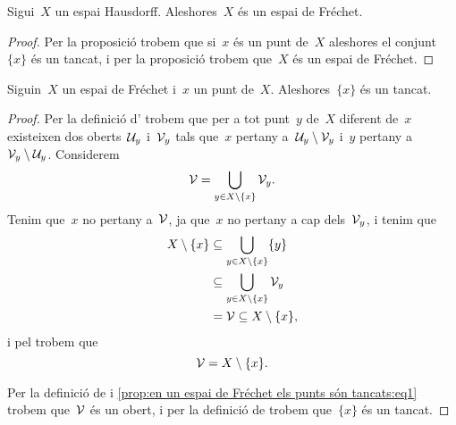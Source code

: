 \documentclass[../../main.tex]{subfiles}
\begin{document}
    \begin{corollary}
        \label{cor:els espais Hausdorff són Fréchet}
        Sigui~\(X\) un espai Hausdorff.
        Aleshores~\(X\) és un espai de Fréchet.
        \begin{proof}
            Per la proposició  trobem que si~\(x\) és un punt de~\(X\) aleshores el conjunt~\(\{x\}\) és un tancat, i per la proposició  trobem que~\(X\) és un espai de Fréchet.
        \end{proof}
    \end{corollary}
    \begin{proposition}
        \label{prop:en un espai de Fréchet els punts són tancats}
        Siguin~\(X\) un espai de Fréchet i~\(x\) un punt de~\(X\).
        Aleshores~\(\{x\}\) és un tancat.
        \begin{proof}
            Per la definició d' trobem que per a tot punt~\(y\) de~\(X\) diferent de~\(x\) existeixen dos oberts~\(\mathcal{U}_{y}\) i~\(\mathcal{V}_{y}\) tals que~\(x\) pertany a~\(\mathcal{U}_{y}\setminus\mathcal{V}_{y}\) i~\(y\) pertany a~\(\mathcal{V}_{y}\setminus\mathcal{U}_{y}\).
            Considerem
            \begin{equation}
                \label{prop:en un espai de Fréchet els punts són tancats:eq1}
                \mathcal{V}=\bigcup_{y\in X\setminus\{x\}}\mathcal{V}_{y}.
            \end{equation}
            Tenim que~\(x\) no pertany a~\(\mathcal{V}\), ja que~\(x\) no pertany a cap dels~\(\mathcal{V}_{y}\), i tenim que
            \begin{align*}
                X\setminus\{x\}&\subseteq\bigcup_{y\in X\setminus\{x\}}\{y\} \\
                &\subseteq\bigcup_{y\in X\setminus\{x\}}\mathcal{V}_{y}\\
                &=\mathcal{V}\subseteq X\setminus\{x\},
            \end{align*}
            i pel  trobem que
            \[
                \mathcal{V}=X\setminus\{x\}.
            \]

            Per la definició de  i \eqref{prop:en un espai de Fréchet els punts són tancats:eq1} trobem que~\(\mathcal{V}\) és un obert, i per la definició de   trobem que~\(\{x\}\) és un tancat.
        \end{proof}
    \end{proposition}
\end{document}
